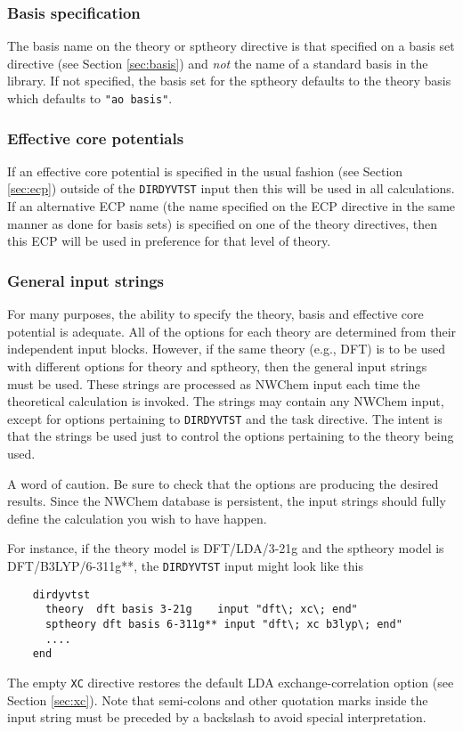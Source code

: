 \subsubsection{Basis specification}
The basis name on the theory or sptheory directive is that
specified on a basis set directive (see Section \ref{sec:basis}) and
{\em not} the name of a standard basis in the library.  If not
specified, the basis set for the sptheory defaults to the
theory basis which defaults to \verb+"ao basis"+.  

\subsubsection{Effective core potentials}
If an effective core potential is specified in the usual fashion (see
Section \ref{sec:ecp}) outside of the \verb+DIRDYVTST+ input then this will be
used in all calculations.  If an alternative ECP name (the name
specified on the ECP directive in the same manner as done for basis
sets) is specified on one of the theory directives, then this ECP will
be used in preference for that level of theory.

\subsubsection{General input strings}

For many purposes, the ability to specify the theory, basis and
effective core potential is adequate.  All of the options for each
theory are determined from their independent input blocks.  However,
if the same theory (e.g., DFT) is to be used with different options
for theory and sptheory, then the general input strings must
be used.  These strings are processed as NWChem input each time the
theoretical calculation is invoked.  The strings may contain any NWChem
input, except for options pertaining to \verb+DIRDYVTST+ and the task directive.
The intent is that the strings be used just to control the options
pertaining to the theory being used.

A word of caution.  Be sure to check that the options are producing
the desired results.  Since the NWChem database is persistent,
the input strings should fully define the calculation you wish to have happen.

For instance, if the theory model is DFT/LDA/3-21g and the
sptheory model is DFT/B3LYP/6-311g**, the \verb+DIRDYVTST+ input might look like this
\begin{verbatim}
    dirdyvtst
      theory  dft basis 3-21g    input "dft\; xc\; end"
      sptheory dft basis 6-311g** input "dft\; xc b3lyp\; end"
      ....
    end
\end{verbatim}
The empty \verb+XC+ directive restores the default LDA
exchange-correlation option (see Section \ref{sec:xc}).  Note that
semi-colons and other quotation marks inside the input string must be
preceded by a backslash to avoid special interpretation.

